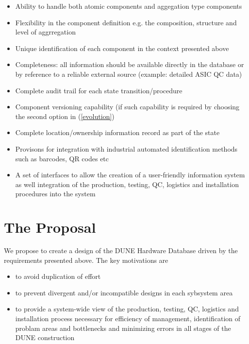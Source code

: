\documentclass[pdftex,12pt,letter]{article}
\begin{document}
\begin{itemize}

\item Ability to handle both atomic components and aggegation type components

\item Flexibility in the component definition e.g. the composition, structure and level of aggrregation

\item Unique identification of each component in the context presented above

\item Completeness: all information should be available directly in the database or by reference to a reliable external source
(example: detailed ASIC QC data)

\item Complete audit trail for each state transition/procedure

\item Component versioning capability (if such capability is required by choosing the second option in (\ref{evolution})

\item Complete location/ownership information record as part of the state

\item Provisons for integration with industrial automated identification methods such as barcodes, QR codes etc

\item A set of interfaces to allow the creation of a user-friendly information system as well integration of the production, testing, QC,
logistics and installation procedures into the system

\end{itemize}


\section{The Proposal}

We propose to create a design of the DUNE Hardware Database driven by the requirements presented above. The key
motivations are

\begin{itemize}

\item to avoid duplication of effort

\item to prevent divergent and/or incompatible designs in each sybsystem area

\item to provide a system-wide view of the production, testing, QC, logistics and installation process necessary
for efficiency of management, identification of problam areas and bottlenecks and minimizing errors in all stages
of the DUNE construction


\end{itemize}
\end{document}
